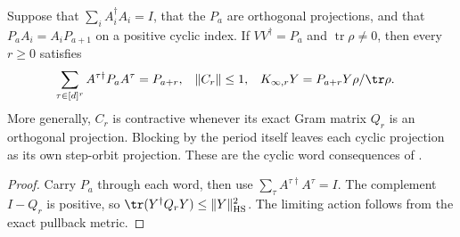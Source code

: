 \begin{lemma}
    \label{thm:correlated_residual_cyclic_corner}
    \leanok
    Suppose that $\sum_iA_i^\dagger A_i=I$, that the $P_a$ are orthogonal
    projections, and that $P_aA_i=A_iP_{a+1}$ on a positive cyclic index.
    If $VV^\dagger=P_a$ and $\operatorname{tr}\rho\neq0$, then every
    $r\geq0$ satisfies
    \begin{align}
        \sum_{\tau\in[d]^r} A^{\tau\dagger}P_aA^\tau & =P_{a+r}, &
        \|C_r\|                                      & \leq1,    & K_{\infty,r}Y & =P_{a+r}Y\rho/\tr\rho.
    \end{align}
    More generally, $C_r$ is contractive whenever its exact Gram matrix
    $Q_r$ is an orthogonal projection. Blocking by the period itself leaves
    each cyclic projection as its own step-orbit projection.
    These are the cyclic word consequences of
    \cite[Lemma~\texttt{blocking-arbitrary}]{DeLasCuevas2017Irreducible}.
\end{lemma}
\begin{proof}\leanok
    Carry $P_a$ through each word, then use
    $\sum_\tau A^{\tau\dagger}A^\tau=I$. The complement $I-Q_r$ is
    positive, so $\tr(Y^\dagger Q_rY)\leq\|Y\|_{\rm HS}^2$.
    The limiting action follows from the exact pullback metric.
\end{proof}

